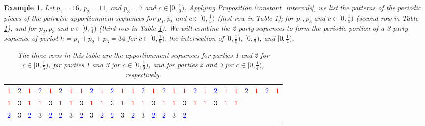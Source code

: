 \documentclass[pdflatex,sn-mathphys-num]{sn-jnl}
\theoremstyle{thmstyleone}%
\theoremstyle{thmstyletwo}%
\newtheorem{example}{Example}%
\theoremstyle{thmstylethree}%
\begin{document}
\begin{example} \label{example-lift}
Let $p_1=16$, $p_2=11$, and $p_3 =7$ and $c \in [0,\frac{1}{9})$.  Applying Proposition \ref{constant_intervals}, we list the patterns of the periodic pieces of the pairwise apportionment sequences for $p_1, p_2$ and $c\in [0, \frac{1}{5})$ (first row in Table \ref{lift-example}); for $p_1, p_3$ and $c \in [0, \frac{1}{9} )$ (second row in Table \ref{lift-example}); and for $p_2, p_3$ and $c \in [0,\frac{1}{4} )$ (third row in Table \ref{lift-example}).  We will combine the 2-party sequences to form the periodic portion of a 3-party sequence of period $h = p_1 + p_2 + p_3=34$ for $c \in [0,\frac{1}{9})$, the intersection of $[0,\frac{1}{5})$, $[0,\frac{1}{9})$, and $[0,\frac{1}{4})$.  


\begin{table}[htb]
\caption{The three rows in this table are the apportionment sequences for parties 1 and 2 for $c \in [0,\frac{1}{5})$, for parties 1 and 3 for $c\in [0,\frac{1}{9})$, and for parties 2 and 3 for $c \in [0, \frac{1}{4})$, respectively.}
\label{lift-example}
\renewcommand{\arraystretch}{1.2}
\setlength{\tabcolsep}{2pt}
\begin{tabular}{c*{26}c}
\textcolor{red}{$1$} & \textcolor{blue}{$2$} & \textcolor{red}{$1$} &  \textcolor{blue}{$2$} & \textcolor{red}{$1$} & \textcolor{blue}{$2$}  & \textcolor{red}{$1$} & \textcolor{red}{$1$} & \textcolor{blue}{$2$}  & \textcolor{red}{$1$} & \textcolor{blue}{$2$} &  \textcolor{red}{$1$} &\textcolor{red}{$1$} & \textcolor{blue}{$2$} &  \textcolor{red}{$1$} & \textcolor{blue}{$2$} & \textcolor{red}{$1$} & \textcolor{red}{$1$} & \textcolor{blue}{$2$} & \textcolor{red}{$1$} & \textcolor{blue}{$2$} & \textcolor{red}{$1$} & \textcolor{red}{$1$} & \textcolor{blue}{$2$} & \textcolor{red}{$1$}  & \textcolor{blue}{$2$} &  \textcolor{red}{$1$}  \\
\textcolor{red}{$1$} & $3$ & \textcolor{red}{$1$} & \textcolor{red}{$1$} & $3$ & \textcolor{red}{$1$} & \textcolor{red}{$1$} & $3$ & \textcolor{red}{$1$} & \textcolor{red}{$1$} & $3$ & \textcolor{red}{$1$} & \textcolor{red}{$1$} & \textcolor{red}{$1$} & $3$ & \textcolor{red}{$1$} & \textcolor{red}{$1$} & $3$ & \textcolor{red}{$1$} & \textcolor{red}{$1$} & $3$ & \textcolor{red}{$1$} & \textcolor{red}{$1$} \\
\textcolor{blue}{$2$} & $3$ & \textcolor{blue}{$2$} & $3$ & \textcolor{blue}{$2$} & \textcolor{blue}{$2$} & $3$ & \textcolor{blue}{$2$} & $3$ & \textcolor{blue}{$2$} & \textcolor{blue}{$2$} & $3$ & \textcolor{blue}{$2$} & $3$ & \textcolor{blue}{$2$} & \textcolor{blue}{$2$} & $3$ & \textcolor{blue}{$2$} \end{tabular} 
\end{table}


\end{example}
\end{document}
